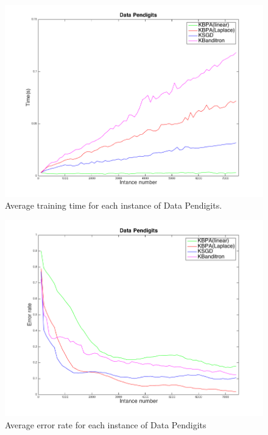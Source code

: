 \documentclass[preprint,12pt,authoryear]{elsarticle}
\begin{document}
\begin{figure}[h!]
	\centerline{
		\includegraphics[scale = 0.4]{figs/Pendigits_kernel_T.png}
	}
	\caption{Average training time for each instance of Data Pendigits.}
	\label{pic:PKT}
\end{figure}

\begin{figure}[h!]
	\centerline{
		\includegraphics[scale = 0.4]{figs/Pendigits_kernel_M.png}}
	\caption{Average error rate for each instance of Data Pendigits}
	\label{pic:PKM}
\end{figure}
\end{document}
